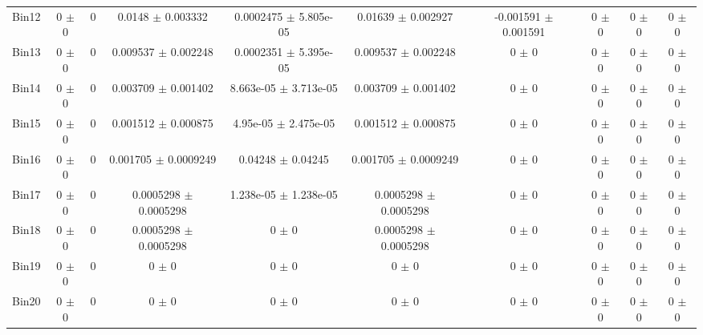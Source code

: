 \begin{tabular}{@{\extracolsep{4pt}}lccccccccc@{}}
     Bin12 & 0 $\pm$ 0 & 0 & 0.0148 $\pm$ 0.003332 & 0.0002475 $\pm$ 5.805e-05 & 0.01639 $\pm$ 0.002927 & -0.001591 $\pm$ 0.001591 & 0 $\pm$ 0 & 0 $\pm$ 0 & 0 $\pm$ 0 \\ 
     Bin13 & 0 $\pm$ 0 & 0 & 0.009537 $\pm$ 0.002248 & 0.0002351 $\pm$ 5.395e-05 & 0.009537 $\pm$ 0.002248 & 0 $\pm$ 0 & 0 $\pm$ 0 & 0 $\pm$ 0 & 0 $\pm$ 0 \\ 
     Bin14 & 0 $\pm$ 0 & 0 & 0.003709 $\pm$ 0.001402 & 8.663e-05 $\pm$ 3.713e-05 & 0.003709 $\pm$ 0.001402 & 0 $\pm$ 0 & 0 $\pm$ 0 & 0 $\pm$ 0 & 0 $\pm$ 0 \\ 
     Bin15 & 0 $\pm$ 0 & 0 & 0.001512 $\pm$ 0.000875 & 4.95e-05 $\pm$ 2.475e-05 & 0.001512 $\pm$ 0.000875 & 0 $\pm$ 0 & 0 $\pm$ 0 & 0 $\pm$ 0 & 0 $\pm$ 0 \\ 
     Bin16 & 0 $\pm$ 0 & 0 & 0.001705 $\pm$ 0.0009249 & 0.04248 $\pm$ 0.04245 & 0.001705 $\pm$ 0.0009249 & 0 $\pm$ 0 & 0 $\pm$ 0 & 0 $\pm$ 0 & 0 $\pm$ 0 \\ 
     Bin17 & 0 $\pm$ 0 & 0 & 0.0005298 $\pm$ 0.0005298 & 1.238e-05 $\pm$ 1.238e-05 & 0.0005298 $\pm$ 0.0005298 & 0 $\pm$ 0 & 0 $\pm$ 0 & 0 $\pm$ 0 & 0 $\pm$ 0 \\ 
     Bin18 & 0 $\pm$ 0 & 0 & 0.0005298 $\pm$ 0.0005298 & 0 $\pm$ 0 & 0.0005298 $\pm$ 0.0005298 & 0 $\pm$ 0 & 0 $\pm$ 0 & 0 $\pm$ 0 & 0 $\pm$ 0 \\ 
     Bin19 & 0 $\pm$ 0 & 0 & 0 $\pm$ 0 & 0 $\pm$ 0 & 0 $\pm$ 0 & 0 $\pm$ 0 & 0 $\pm$ 0 & 0 $\pm$ 0 & 0 $\pm$ 0 \\ 
     Bin20 & 0 $\pm$ 0 & 0 & 0 $\pm$ 0 & 0 $\pm$ 0 & 0 $\pm$ 0 & 0 $\pm$ 0 & 0 $\pm$ 0 & 0 $\pm$ 0 & 0 $\pm$ 0 \\ 
\hline\hline
  \end{tabular}
